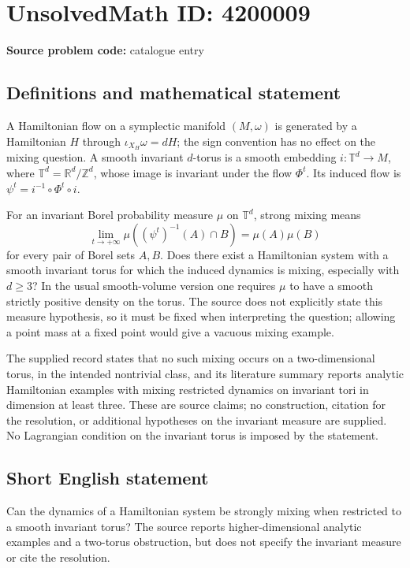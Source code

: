 \documentclass[11pt]{article}
\begin{document}
\section*{UnsolvedMath ID: 4200009}
\textbf{Source problem code:} catalogue entry
\subsection{Definitions and mathematical statement}
A Hamiltonian flow on a symplectic manifold $(M,\omega)$ is generated by a Hamiltonian $H$ through $\iota_{X_H}\omega=dH$; the sign convention has no effect on the mixing question. A smooth invariant $d$-torus is a smooth embedding $i:\mathbb T^d\to M$, where $\mathbb T^d=\mathbb R^d/\mathbb Z^d$, whose image is invariant under the flow $\Phi^t$. Its induced flow is $\psi^t=i^{-1}\circ\Phi^t\circ i$.

For an invariant Borel probability measure $\mu$ on $\mathbb T^d$, strong mixing means
\[
\lim_{t\to+\infty}\mu((\psi^t)^{-1}(A)\cap B)=\mu(A)\mu(B)
\]
for every pair of Borel sets $A,B$. Does there exist a Hamiltonian system with a smooth invariant torus for which the induced dynamics is mixing, especially with $d\geq3$? In the usual smooth-volume version one requires $\mu$ to have a smooth strictly positive density on the torus. The source does not explicitly state this measure hypothesis, so it must be fixed when interpreting the question; allowing a point mass at a fixed point would give a vacuous mixing example.

The supplied record states that no such mixing occurs on a two-dimensional torus, in the intended nontrivial class, and its literature summary reports analytic Hamiltonian examples with mixing restricted dynamics on invariant tori in dimension at least three. These are source claims; no construction, citation for the resolution, or additional hypotheses on the invariant measure are supplied. No Lagrangian condition on the invariant torus is imposed by the statement.
\subsection{Short English statement}
Can the dynamics of a Hamiltonian system be strongly mixing when restricted to a smooth invariant torus? The source reports higher-dimensional analytic examples and a two-torus obstruction, but does not specify the invariant measure or cite the resolution.
\end{document}
